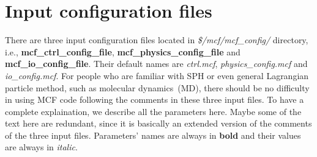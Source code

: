 \documentclass[a4paper,10pt]{article}
\begin{document}
\section{Input configuration files}
There are three input configuration files
located in \textit{\$/mcf/mcf\_config/} directory,
i.e., \textbf{mcf\_ctrl\_config\_file}, 
\textbf{mcf\_physics\_config\_file}
and \textbf{mcf\_io\_config\_file}.
Their default names are
\textit{ctrl.mcf}, \textit{physics\_config.mcf} and
\textit{io\_config.mcf}.
For people who are familiar with SPH
or even general Lagrangian particle method,
such as molecular dynamics~(MD),
there should be no difficulty in using MCF code
following the comments in these three input files.
To have a complete explaination,
we describe all the parameters here.
Maybe some of the text here are redundant,
since it is basically an extended version of the comments
of the three input files.
Parameters' names are always in \textbf{bold}
and their values are always in \textit{italic}.
\end{document}
